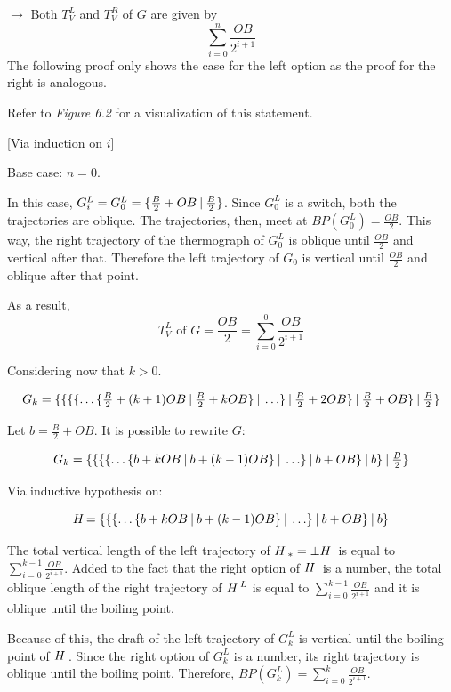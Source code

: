 \begin{list}{}{}
	\item[$\rightarrow$] Both $T^L_V$ and $T^R_V$ of $G$ are given by 
	$$\sum_{i=0}^n\frac{OB}{2^{i+1}}$$
	The following proof only shows the case for the left option as the proof for the right is analogous.
	
	Refer to \textit{Figure 6.2} for a visualization of this statement.
	
	[Via induction on $i$]
	
	Base case: $n = 0$.
	
	In this case, $G_i^L = G_0^L = \mbox{$\{\frac{B}{2} + OB\:|\:\frac{B}{2}\}$}$. Since $G_0^L$ is a switch, both the trajectories are oblique. The trajectories, then, meet at $BP(G_0^L) = \frac{OB}{2}$. This way, the right trajectory of the thermograph of $G_0^L$ is oblique until $\frac{OB}{2}$ and vertical after that. Therefore the left trajectory of $G_0$ is vertical until $\frac{OB}{2}$ and oblique after that point.
	
	As a result, 
	$$T^L_V \text{ of } G = \frac{OB}{2} = \sum_{i=0}^0\frac{OB}{2^{i+1}}$$
	
	Considering now that $k > 0$.
	
	$$
	\mbox{$G_k=\mbox{$\{
			\mbox{$\{
				\mbox{$\{
					\mbox{$\{\ldots
						\mbox{$\{\frac{B}{2} + (k+1)OB\:|\:\frac{B}{2} + kOB\}$}
						\:|\:\ldots\}$}
					\:|\:\frac{B}{2} + 2OB\}$}
				\:|\:\frac{B}{2}+OB\}$}
			\:|\:\frac{B}{2}\}$}
		$}
	$$
	
	Let $b = \frac{B}{2}+OB$. It is possible to rewrite $G$:
	
	$$
	\mbox{$G_k=\mbox{$\{
			\mbox{$\{
				\mbox{$\{
					\mbox{$\{\ldots
						\mbox{$\{b + kOB\:|\:b + (k-1)OB\}$}
					\:|\:\ldots\}$}
				\:|\:b+OB\}$}
			\:|\:b\}$}
		\:|\:\frac{B}{2}\}$}
	$}
	$$
	
	Via inductive hypothesis on:
	
	$$
	\mbox{$H\,$}{=
			\mbox{$\{
				\mbox{$\{
					\mbox{$\{\ldots
						\mbox{$\{b + kOB\:|\:b + (k-1)OB\}$}
					\:|\:\ldots\}$}
				\:|\:b + OB\}$}
			\:|\:b\}$}
	}
	$$
	
	The total vertical length of the left trajectory of $\mbox{$H\,$}_* = \pm \mbox{$H\,$}$ is equal to $\sum\limits_{i=0}^{k-1}\frac{OB}{2^{i+1}}$. Added to  the fact that the right option of $\mbox{$H\,$}$ is a number, the total oblique length of the right trajectory of $\mbox{$H\,$}^L$ is equal to $\sum\limits_{i=0}^{k-1}\frac{OB}{2^{i+1}}$ and it is oblique until the boiling point. 
	
	Because of this, the draft of the left trajectory of $G_k^L$ is vertical until the boiling point of $\mbox{$H\,$}$. Since the right option of $G_k^L$ is a number, its right trajectory is oblique until the boiling point. Therefore, $BP(G_k^L) = \sum\limits_{i=0}^{k}\frac{OB}{2^{i+1}}$.
	

\end{list}
